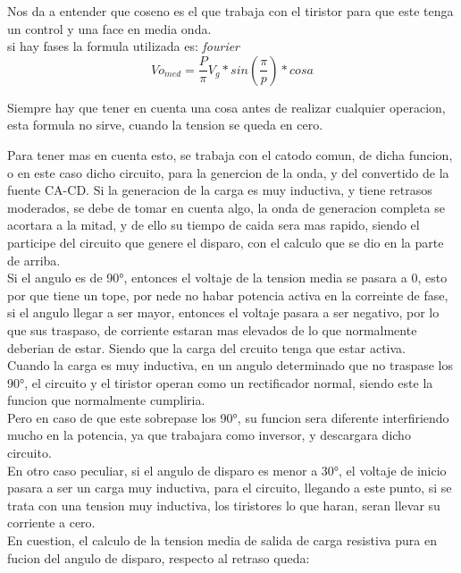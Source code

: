 \documentclass[12pt,a4paper]{article}
\begin{document}
Nos da a entender que coseno es el que trabaja con el tiristor para que este tenga un control y una face en media onda.\\
si hay fases la formula utilizada es:
\emph{fourier}
$$ Vo_{med}= \frac{P}{\pi} V_{g}* sin(\frac{\pi}{p})* cos a $$

Siempre hay que tener en cuenta una cosa antes de realizar cualquier operacion, esta formula no sirve, cuando la tension se queda en cero.

Para tener mas en cuenta esto, se trabaja con el catodo comun, de dicha funcion, o en este caso dicho circuito, para la genercion de la onda, y del convertido de la fuente CA-CD. Si la generacion de la carga es muy inductiva, y tiene retrasos moderados, se debe de tomar en cuenta algo, la onda de generacion completa se acortara a la mitad, y de ello su tiempo de caida sera mas rapido, siendo el participe del circuito que genere el disparo, con el calculo que se dio en la parte de arriba.\\

Si el angulo es de 90°, entonces el voltaje de la tension media se pasara a 0, esto por que tiene un tope, por nede no habar potencia activa en la correinte de fase, si el angulo llegar a ser mayor, entonces el voltaje pasara a ser negativo, por lo que sus traspaso, de corriente estaran mas elevados de lo que normalmente deberian de estar. Siendo que la carga del crcuito tenga que estar activa.\\

Cuando la carga es muy inductiva, en un angulo determinado que no traspase los 90°, el circuito y el tiristor operan como un rectificador normal, siendo este la funcion que normalmente cumpliria.\\ 

Pero en caso de que este sobrepase los 90°, su funcion sera diferente interfiriendo mucho en la potencia, ya que trabajara como inversor, y descargara dicho circuito.\\

En otro caso peculiar, si el angulo de disparo es menor a 30°, el voltaje de inicio pasara a ser un carga muy inductiva, para el circuito, llegando a este punto, si se trata con una tension muy inductiva, los tiristores lo que haran, seran llevar su corriente a cero.\\

En cuestion, el calculo de la tension media de salida de carga resistiva pura en fucion del angulo de disparo, respecto al retraso queda:
\end{document}
